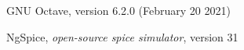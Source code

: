 \begin{thebibliography}{9}
\label{bibliography}

GNU Octave, version 6.2.0 (February 20 2021)

NgSpice, \emph{open-source spice simulator}, version 31
\end{thebibliography}

